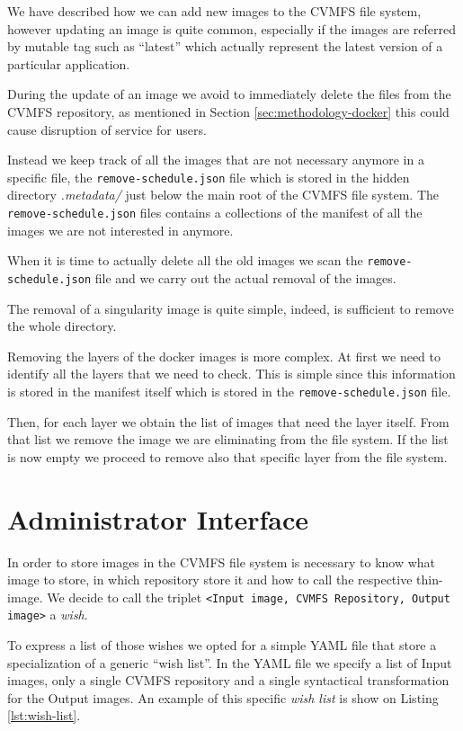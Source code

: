 We have described how we can add new images to the CVMFS file system, however
updating an image is quite common, especially if the images are referred by
mutable tag such as “latest” which actually represent the latest version of a
particular application.

During the update of an image we avoid to immediately delete the files from the
CVMFS repository, as mentioned in Section \ref{sec:methodology-docker} this could cause
disruption of service for users.

Instead we keep track of all the images that are not necessary anymore in a
specific file, the \texttt{remove-schedule.json} file which is stored in the
hidden directory \textit{.metadata/} just below the main root of the CVMFS file
system. The \texttt{remove-schedule.json} files contains a collections of the
manifest of all the images we are not interested in anymore.

When it is time to actually delete all the old images we scan the
\texttt{remove-schedule.json} file and we carry out the actual removal of the
images. 

The removal of a singularity image is quite simple, indeed, is sufficient to
remove the whole directory.

Removing the layers of the docker images is more complex. At first we need to
identify all the layers that we need to check. This is simple since this
information is stored in the manifest itself which is stored in the
\texttt{remove-schedule.json} file.

Then, for each layer we obtain the list of images that need the layer itself.
From that list we remove the image we are eliminating from the file system. If
the list is now empty we proceed to remove also that specific layer from the
file system.

\section{Administrator Interface}

In order to store images in the CVMFS file system is necessary to know what
image to store, in which repository store it and how to call the respective
thin-image. We decide to call the triplet \texttt{<Input image, CVMFS
Repository, Output image>} a \textit{wish}.

To express a list of those wishes we opted for a simple YAML file that store a
specialization of a generic “wish list”. In the YAML file we specify a list of
Input images, only a single CVMFS repository and a single syntactical
transformation for the Output images. An example of this specific \textit{wish
list} is show on Listing \ref{lst:wish-list}.

